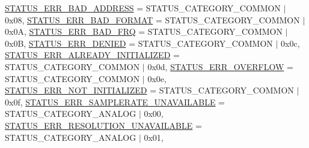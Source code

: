 \begin{DoxyCompactItemize}
\mbox{\hyperlink{group__group__sam0__utils__status__codes_gga751c892e5a46b8e7d282085a5a5bf151a920d7fdabfcb389e261dc11221198fba}{S\+T\+A\+T\+U\+S\+\_\+\+E\+R\+R\+\_\+\+B\+A\+D\+\_\+\+A\+D\+D\+R\+E\+SS}} = S\+T\+A\+T\+U\+S\+\_\+\+C\+A\+T\+E\+G\+O\+R\+Y\+\_\+\+C\+O\+M\+M\+ON $\vert$ 0x08, 
\mbox{\hyperlink{group__group__sam0__utils__status__codes_gga751c892e5a46b8e7d282085a5a5bf151aa358c3214c71453a1101b3ad9363ded3}{S\+T\+A\+T\+U\+S\+\_\+\+E\+R\+R\+\_\+\+B\+A\+D\+\_\+\+F\+O\+R\+M\+AT}} = S\+T\+A\+T\+U\+S\+\_\+\+C\+A\+T\+E\+G\+O\+R\+Y\+\_\+\+C\+O\+M\+M\+ON $\vert$ 0x0A, 
\newline
\mbox{\hyperlink{group__group__sam0__utils__status__codes_gga751c892e5a46b8e7d282085a5a5bf151aa991acce03ee14a54051f8d54e6af42c}{S\+T\+A\+T\+U\+S\+\_\+\+E\+R\+R\+\_\+\+B\+A\+D\+\_\+\+F\+RQ}} = S\+T\+A\+T\+U\+S\+\_\+\+C\+A\+T\+E\+G\+O\+R\+Y\+\_\+\+C\+O\+M\+M\+ON $\vert$ 0x0B, 
\mbox{\hyperlink{group__group__sam0__utils__status__codes_gga751c892e5a46b8e7d282085a5a5bf151a6f46a8c23ec2a794c9887da522cb4a92}{S\+T\+A\+T\+U\+S\+\_\+\+E\+R\+R\+\_\+\+D\+E\+N\+I\+ED}} = S\+T\+A\+T\+U\+S\+\_\+\+C\+A\+T\+E\+G\+O\+R\+Y\+\_\+\+C\+O\+M\+M\+ON $\vert$ 0x0c, 
\mbox{\hyperlink{group__group__sam0__utils__status__codes_gga751c892e5a46b8e7d282085a5a5bf151a01ad1a23c0855bef2b8f932d793c2031}{S\+T\+A\+T\+U\+S\+\_\+\+E\+R\+R\+\_\+\+A\+L\+R\+E\+A\+D\+Y\+\_\+\+I\+N\+I\+T\+I\+A\+L\+I\+Z\+ED}} = S\+T\+A\+T\+U\+S\+\_\+\+C\+A\+T\+E\+G\+O\+R\+Y\+\_\+\+C\+O\+M\+M\+ON $\vert$ 0x0d, 
\mbox{\hyperlink{group__group__sam0__utils__status__codes_gga751c892e5a46b8e7d282085a5a5bf151a658bbde8172385dad36ef49c2a439714}{S\+T\+A\+T\+U\+S\+\_\+\+E\+R\+R\+\_\+\+O\+V\+E\+R\+F\+L\+OW}} = S\+T\+A\+T\+U\+S\+\_\+\+C\+A\+T\+E\+G\+O\+R\+Y\+\_\+\+C\+O\+M\+M\+ON $\vert$ 0x0e, 
\newline
\mbox{\hyperlink{group__group__sam0__utils__status__codes_gga751c892e5a46b8e7d282085a5a5bf151a099589c33a389952b82d31db3622bc58}{S\+T\+A\+T\+U\+S\+\_\+\+E\+R\+R\+\_\+\+N\+O\+T\+\_\+\+I\+N\+I\+T\+I\+A\+L\+I\+Z\+ED}} = S\+T\+A\+T\+U\+S\+\_\+\+C\+A\+T\+E\+G\+O\+R\+Y\+\_\+\+C\+O\+M\+M\+ON $\vert$ 0x0f, 
\mbox{\hyperlink{group__group__sam0__utils__status__codes_gga751c892e5a46b8e7d282085a5a5bf151ae0568016eb57828f93b76bacc912a9ef}{S\+T\+A\+T\+U\+S\+\_\+\+E\+R\+R\+\_\+\+S\+A\+M\+P\+L\+E\+R\+A\+T\+E\+\_\+\+U\+N\+A\+V\+A\+I\+L\+A\+B\+LE}} = S\+T\+A\+T\+U\+S\+\_\+\+C\+A\+T\+E\+G\+O\+R\+Y\+\_\+\+A\+N\+A\+L\+OG $\vert$ 0x00, 
\mbox{\hyperlink{group__group__sam0__utils__status__codes_gga751c892e5a46b8e7d282085a5a5bf151a1c81613a9ffb602d320d613f3786232d}{S\+T\+A\+T\+U\+S\+\_\+\+E\+R\+R\+\_\+\+R\+E\+S\+O\+L\+U\+T\+I\+O\+N\+\_\+\+U\+N\+A\+V\+A\+I\+L\+A\+B\+LE}} = S\+T\+A\+T\+U\+S\+\_\+\+C\+A\+T\+E\+G\+O\+R\+Y\+\_\+\+A\+N\+A\+L\+OG $\vert$ 0x01, 

\end{DoxyCompactItemize}
